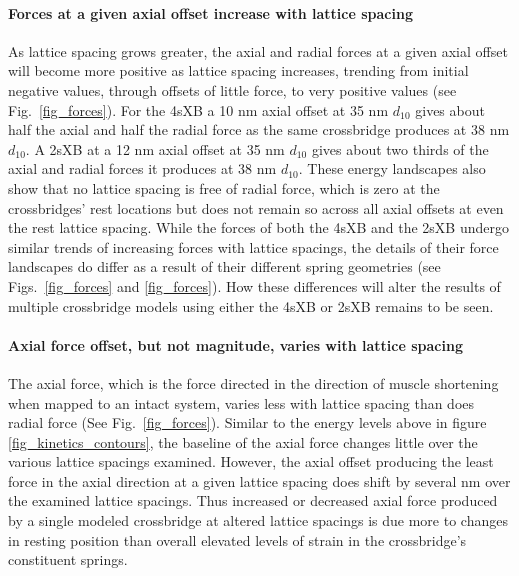 \documentclass[]{article}
\begin{document}
\paragraph{Forces at a given axial offset increase with lattice spacing} %
As lattice spacing grows greater, the axial and radial forces at a given axial offset will become more positive as lattice spacing increases, trending from initial negative values, through offsets of little force, to very positive values (see Fig.\ \ref{fig_forces}). 
For the 4sXB a 10 nm axial offset at 35 nm $d_{10}$ gives about half the axial and half the radial force as the same crossbridge produces at 38 nm $d_{10}$. 
A 2sXB at a 12 nm axial offset at 35 nm $d_{10}$ gives about two thirds of the axial and radial forces it produces at 38 nm $d_{10}$. 
These energy landscapes also show that no lattice spacing is free of radial force, which is zero at the crossbridges' rest locations but does not remain so across all axial offsets at even the rest lattice spacing. 
While the forces of both the 4sXB and the 2sXB undergo similar trends of increasing forces with lattice spacings, the details of their force landscapes do differ as a result of their different spring geometries (see Figs.\ \ref{fig_forces} and \ref{fig_forces}). 
How these differences will alter the results of multiple crossbridge models using either the 4sXB or 2sXB remains to be seen. 


\paragraph{Axial force offset, but not magnitude, varies with lattice spacing} %
The axial force, which is the force directed in the direction of muscle shortening when mapped to an intact system, varies less with lattice spacing than does radial force (See Fig.\ \ref{fig_forces}). 
Similar to the energy levels above in figure \ref{fig_kinetics_contours}, the baseline of the axial force changes little over the various lattice spacings examined. 
However, the axial offset producing the least force in the axial direction at a given lattice spacing does shift by several nm over the examined lattice spacings. 
Thus increased or decreased axial force produced by a single modeled crossbridge at altered lattice spacings is due more to changes in resting position than overall elevated levels of strain in the crossbridge's constituent springs.
\end{document}
